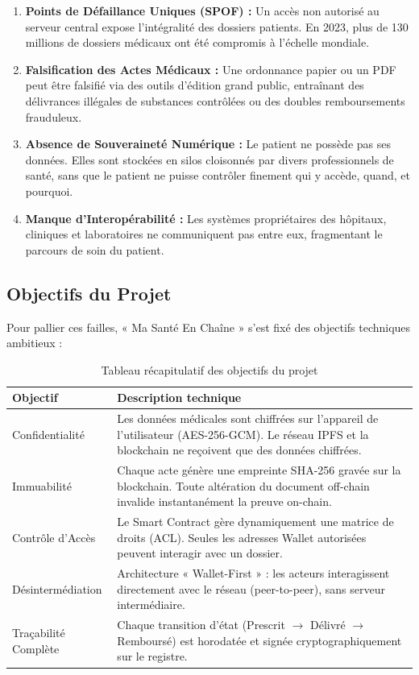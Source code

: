 \documentclass[12pt,a4paper]{report}
\begin{document}
\begin{enumerate}
    \item \textbf{Points de Défaillance Uniques (SPOF) :} Un accès non autorisé au serveur central expose l'intégralité des dossiers patients. En 2023, plus de 130 millions de dossiers médicaux ont été compromis à l'échelle mondiale.
    \item \textbf{Falsification des Actes Médicaux :} Une ordonnance papier ou un PDF peut être falsifié via des outils d'édition grand public, entraînant des délivrances illégales de substances contrôlées ou des doubles remboursements frauduleux.
    \item \textbf{Absence de Souveraineté Numérique :} Le patient ne possède pas ses données. Elles sont stockées en silos cloisonnés par divers professionnels de santé, sans que le patient ne puisse contrôler finement qui y accède, quand, et pourquoi.
    \item \textbf{Manque d'Interopérabilité :} Les systèmes propriétaires des hôpitaux, cliniques et laboratoires ne communiquent pas entre eux, fragmentant le parcours de soin du patient.
\end{enumerate}

\subsection{Objectifs du Projet}
Pour pallier ces failles, « Ma Santé En Chaîne » s'est fixé des objectifs techniques ambitieux :

\begin{table}[H]
    \centering
    \caption{Tableau récapitulatif des objectifs du projet}
    \label{tab:objectifs}
    \begin{tabular}{|p{4cm}|p{9.5cm}|}
        \hline
        \textbf{Objectif} & \textbf{Description technique} \\
        \hline
        Confidentialité & Les données médicales sont chiffrées sur l'appareil de l'utilisateur (AES-256-GCM). Le réseau IPFS et la blockchain ne reçoivent que des données chiffrées. \\
        \hline
        Immuabilité & Chaque acte génère une empreinte SHA-256 gravée sur la blockchain. Toute altération du document off-chain invalide instantanément la preuve on-chain. \\
        \hline
        Contrôle d'Accès & Le Smart Contract gère dynamiquement une matrice de droits (ACL). Seules les adresses Wallet autorisées peuvent interagir avec un dossier. \\
        \hline
        Désintermédiation & Architecture « Wallet-First » : les acteurs interagissent directement avec le réseau (peer-to-peer), sans serveur intermédiaire. \\
        \hline
        Traçabilité Complète & Chaque transition d'état (Prescrit $\rightarrow$ Délivré $\rightarrow$ Remboursé) est horodatée et signée cryptographiquement sur le registre. \\
        \hline
    \end{tabular}
\end{table}
\end{document}
